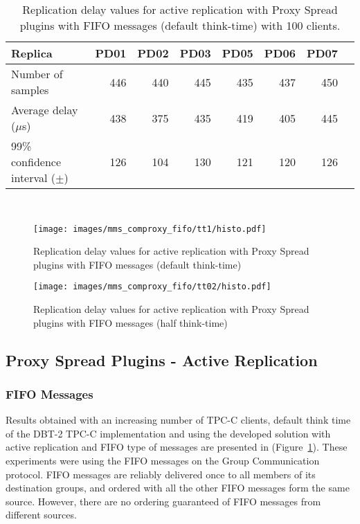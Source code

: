 \begin{table}[h]
\centering    
\begin{tabular}{lrrrrrrr}
 \hline\hline
 Replica & PD01 & PD02 & PD03 & PD05 & PD06 & PD07 \\
\hline
Number of samples & 446 & 440 & 445 & 435 & 437 & 450 \\
Average delay ($\mu$s) & 438 & 375 & 435 & 419 & 405 & 445 \\
99\% confidence interval ($\pm$) & 126 & 104 & 130 & 121 & 120 & 126 \\
\hline
\end{tabular}

~\\
\caption{Replication delay values for active replication with Proxy Spread plugins with FIFO messages (default think-time) with 100 clients.}
\label{tab:table3}
\end{table}

\begin{figure}[h]
\centering    
\texttt{[image: images/mms\_comproxy\_fifo/tt1/histo.pdf]}
\caption{Replication delay values for active replication with Proxy Spread plugins with FIFO messages (default think-time)}
\label{fig:mms_comproxy_tt1}
\end{figure}

\begin{figure}[h]
\centering    
\texttt{[image: images/mms\_comproxy\_fifo/tt02/histo.pdf]}
\caption{Replication delay values for active replication with Proxy Spread plugins with FIFO messages (half think-time)}
\label{fig:mms_comproxy_tt02}
\end{figure}

\vspace{15mm}

\subsection{Proxy Spread Plugins - Active Replication}

\subsubsection{FIFO Messages}


Results obtained with an increasing number of TPC-C clients, default think time of the DBT-2 TPC-C implementation and using the developed solution with active replication and FIFO type of messages are presented in (Figure~\ref{fig:mms_comproxy_tt1}). These experiments were using the FIFO messages on the Group Communication protocol. FIFO messages are reliably delivered once to all members of its destination groups, and ordered with all the other FIFO messages form the same source. However, there are no ordering guaranteed of FIFO messages from different sources.

